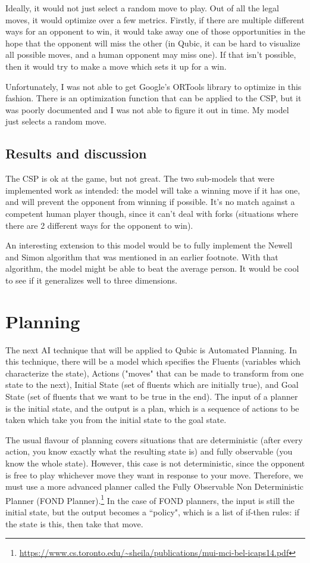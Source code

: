 \documentclass[11pt]{article}
\begin{document}
Ideally, it would not just select a random move to play. Out of all the legal moves, it would optimize over a few metrics. Firstly, if there are multiple different ways for an opponent to win, it would take away one of those opportunities in the hope that the opponent will miss the other (in Qubic, it can be hard to visualize all possible moves, and a human opponent may miss one). If that isn't possible, then it would try to make a move which sets it up for a win.

Unfortunately, I was not able to get Google's ORTools library to optimize in this fashion. There is an optimization function that can be applied to the CSP, but it was poorly documented and I was not able to figure it out in time. My model just selects a random move.

\subsection{Results and discussion}
The CSP is ok at the game, but not great. The two sub-models that were implemented work as intended: the model will take a winning move if it has one, and will prevent the opponent from winning if possible. It's no match against a competent human player though, since it can't deal with forks (situations where there are 2 different ways for the opponent to win). 

An interesting extension to this model would be to fully implement the Newell and Simon algorithm that was mentioned in an earlier footnote. With that algorithm, the model might be able to beat the average person. It would be cool to see if it generalizes well to three dimensions.


\section{Planning}
The next AI technique that will be applied to Qubic is Automated Planning. In this technique, there will be a model which specifies the Fluents (variables which characterize the state), Actions ("moves" that can be made to transform from one state to the next), Initial State (set of fluents which are initially true), and Goal State (set of fluents that we want to be true in the end). The input of a planner is the initial state, and the output is a plan, which is a sequence of actions to be taken which take you from the initial state to the goal state.

The usual flavour of planning covers situations that are deterministic (after every action, you know exactly what the resulting state is) and fully observable (you know the whole state). However, this case is not deterministic, since the opponent is free to play whichever move they want in response to your move. Therefore, we must use a more advanced planner called the Fully Observable Non Deterministic Planner (FOND Planner).\footnote{\url{https://www.cs.toronto.edu/~sheila/publications/mui-mci-bel-icaps14.pdf}} In the case of FOND planners, the input is still the initial state, but the output becomes a ``policy", which is a list of if-then rules: if the state is this, then take that move.
\end{document}
